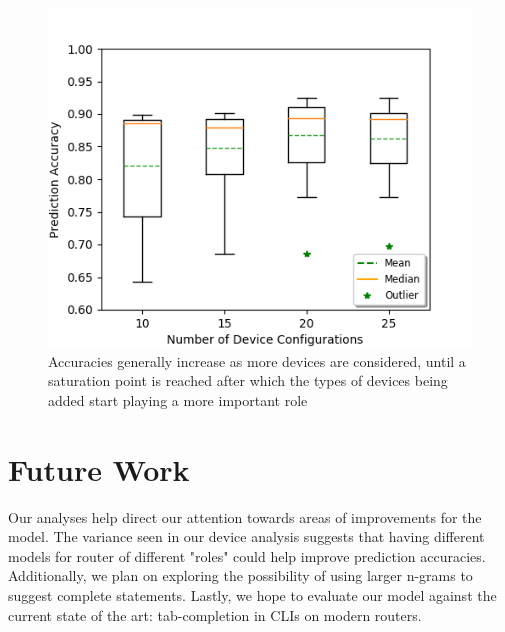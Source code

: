 \begin{figure}
	\centering
	\includegraphics[width=\columnwidth]{device_analysis.png}
	\caption{Accuracies generally increase as more devices are considered, until a saturation point is reached after which the types of devices being added start playing a more important role}
    \label{fig:umn_analysis}
\end{figure}

\section{Future Work}

Our analyses help direct our attention towards areas of improvements for the model. The variance seen in our device analysis suggests that having different models for router of different "roles" could help improve prediction accuracies. Additionally, we plan on exploring the possibility of using larger n-grams to suggest complete statements. Lastly, we hope to evaluate our model against the current state of the art: tab-completion in CLIs on modern routers.